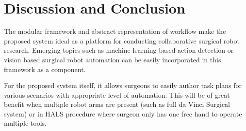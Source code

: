 \documentclass[letterpaper, 10 pt, conference]{ieeeconf}
\begin{document}
\section{Discussion and Conclusion}
The modular framework and abstract representation of workflow make the proposed system ideal as a platform for conducting collaborative surgical robot research. Emerging topics such as machine learning based action detection or vision based surgical robot automation can be easily incorporated in this framework as a component. 

For the proposed system itself, it allows surgeons to easily author task plans for various scenarios with appropriate level of automation. This will be of great benefit when multiple robot arms are present (such as full da Vinci Surgical system) or in HALS procedure \cite{bauzano2016collaborative} where surgeon only has one free hand to operate multiple tools. 

\addtolength{\textheight}{-12cm}   %







%






\end{document}
